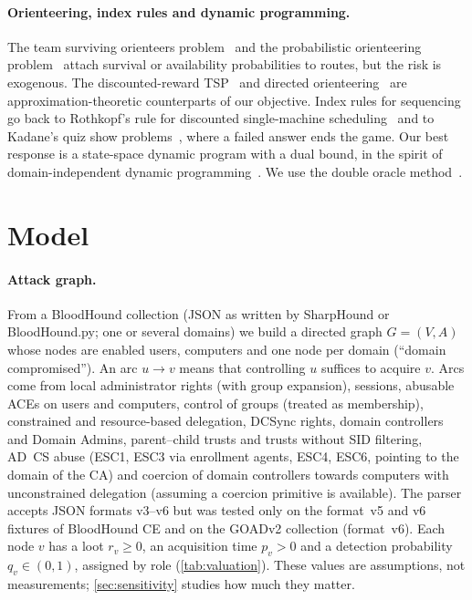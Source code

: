 \documentclass[runningheads]{llncs}
\begin{document}
\paragraph{Orienteering, index rules and dynamic programming.}
The team surviving orienteers problem~\cite{jorgensen2017team} and the probabilistic orienteering problem~\cite{angelelli2017probabilistic} attach survival or availability probabilities to routes, but the risk is exogenous. The discounted-reward TSP~\cite{blum2007orienteering} and directed orienteering~\cite{nagarajan2011directed} are approximation-theoretic counterparts of our objective. Index rules for sequencing go back to Rothkopf's rule for discounted single-machine scheduling~\cite{rothkopf1966} and to Kadane's quiz show problems~\cite{kadane1969quiz}, where a failed answer ends the game. Our best response is a state-space dynamic program with a dual bound, in the spirit of domain-independent dynamic programming~\cite{kuroiwa2023didp}. We use the double oracle method~\cite{mcmahan2003planning,jain2011double}.

\section{Model}\label{sec:model}

\paragraph{Attack graph.}
From a BloodHound collection (JSON as written by SharpHound or BloodHound.py; one or several domains) we build a directed graph $G=(V,A)$ whose nodes are enabled users, computers and one node per domain (``domain compromised''). An arc $u\to v$ means that controlling $u$ suffices to acquire $v$. Arcs come from local administrator rights (with group expansion), sessions, abusable ACEs on users and computers, control of groups (treated as membership), constrained and resource-based delegation, DCSync rights, domain controllers and Domain Admins, parent--child trusts and trusts without SID filtering, AD~CS abuse (ESC1, ESC3 via enrollment agents, ESC4, ESC6, pointing to the domain of the CA) and coercion of domain controllers towards computers with unconstrained delegation (assuming a coercion primitive is available). The parser accepts JSON formats v3--v6 but was tested only on the format~v5 and v6 fixtures of BloodHound CE and on the GOADv2 collection (format~v6). Each node $v$ has a loot $r_v\ge0$, an acquisition time $p_v>0$ and a detection probability $q_v\in(0,1)$, assigned by role (\cref{tab:valuation}). These values are assumptions, not measurements; \cref{sec:sensitivity} studies how much they matter.
\end{document}
